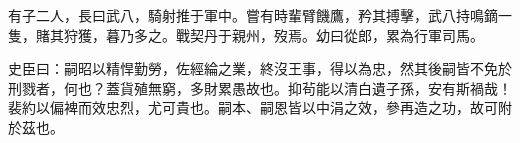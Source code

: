 \begin{pinyinscope}
 有子二人，長曰武八，騎射推于軍中。嘗有時輩臂饑鷹，矜其搏擊，武八持鳴鏑一隻，賭其狩獲，暮乃多之。戰契丹于親州，歿焉。幼曰從郎，累為行軍司馬。



 史臣曰：嗣昭以精悍勤勞，佐經綸之業，終沒王事，得以為忠，然其後嗣皆不免於刑戮者，何也？蓋貨殖無窮，多財累愚故也。抑茍能以清白遺子孫，安有斯禍哉！裴約以偏裨而效忠烈，尤可貴也。嗣本、嗣恩皆以中涓之效，參再造之功，故可附於茲也。



\end{pinyinscope}